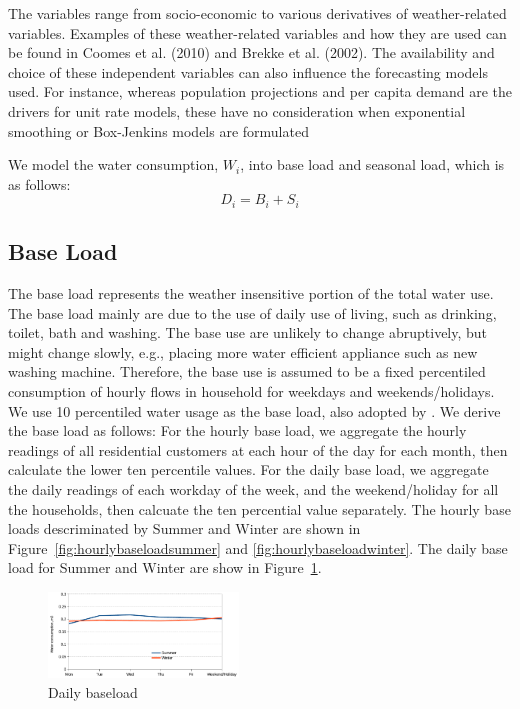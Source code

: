 \documentclass{sig-alternate}
\newcommand{\eg}{e.g.}
\begin{document}
The variables range from socio-economic to various derivatives of weather-related variables. Examples of these weather-related variables and how they are used can be found in Coomes et al. (2010) and Brekke et al. (2002).   The availability and choice of these independent variables can also influence the forecasting models used. For instance, whereas population projections and per capita demand are the drivers for unit rate models, these have no consideration when exponential smoothing or Box-Jenkins models are formulated


We model the water consumption, $W_i$, into base load and seasonal load, which is as follows:
\begin{equation}
D_i = B_i + S_i 
\end{equation}

\subsection{Base Load}
The base load represents the weather insensitive portion of the total water use. The base load mainly are due to the use of daily use of living, such as drinking, toilet, bath and washing. The base use are unlikely to change abruptively, but might change slowly, \eg, placing more water efficient appliance such as new washing machine.  Therefore, the base use is assumed to be a fixed percentiled consumption of hourly flows in household for weekdays and weekends/holidays. We use 10 percentiled water usage as the base load, also adopted by \cite{zhou2002}. We derive the base load as follows: For the hourly base load, we aggregate the hourly readings of all residential customers at each hour of the day for each month, then calculate the lower ten percentile values. For the daily base load, we aggregate the daily readings of each workday of the week, and the weekend/holiday for all the households, then calcuate the ten percential value separately. The hourly base loads descriminated by Summer and Winter are shown in Figure~\ref{fig:hourlybaseloadsummer} and \ref{fig:hourlybaseloadwinter}. The daily base load for Summer and Winter are show in Figure~\ref{fig:dailybaseload}.
\begin{figure}[htp]
\centering
\includegraphics[width=0.45\textwidth]{images/dailybaseload}
\vspace{-5pt}
\caption{Daily baseload}
\label{fig:dailybaseload}
\end{figure}
\end{document}
